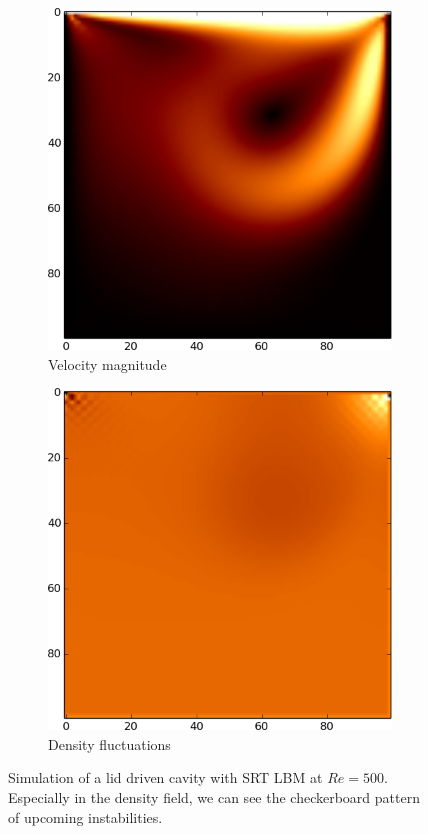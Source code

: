 \begin{figure}
\centering
\begin{subfigure}{.5\textwidth}
\label{fig: velocity SRT}
  \centering
  \includegraphics[width=0.8\linewidth]{../figures/ldc_re500_vel2_0019_trim.png} %
  \caption{Velocity magnitude }
\end{subfigure}%
\begin{subfigure}{.5\textwidth}
\label{fig: density SRT}
  \centering
  \includegraphics[width=0.8\linewidth]{../figures/ldc_re500_rho2_0019_trim.png} %
  \caption{Density fluctuations}
\end{subfigure}
\caption{Simulation of a lid driven cavity with SRT LBM at $Re=500$. Especially in the density field, we can see the checkerboard pattern of upcoming instabilities.}
\label{fig: spurious modes SRT}
\end{figure}

